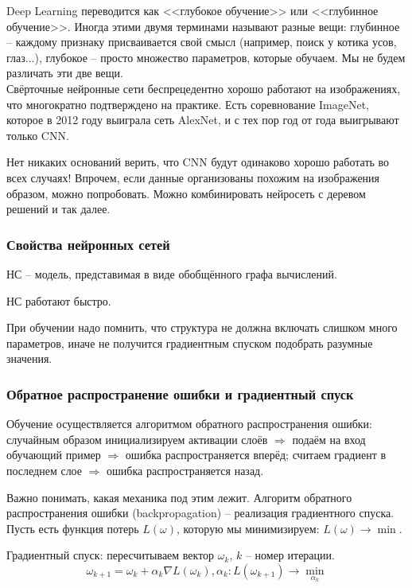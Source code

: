 \documentclass[main.tex]{subfiles}
\begin{document}
Deep Learning переводится как <<глубокое обучение>> или <<глубинное обучение>>.
Иногда этими двумя терминами называют разные вещи: глубинное -- каждому признаку присваивается свой смысл (например, поиск у котика усов, глаз...), глубокое -- просто множество параметров, которые обучаем.
Мы не будем различать эти две вещи. \\

Свёрточные нейронные сети беспрецедентно хорошо работают на изображениях, что многократно подтверждено на практике.
Есть соревнование ImageNet, которое в 2012 году выиграла сеть AlexNet, и с тех пор год от года выигрывают только CNN.

Нет никаких оснований верить, что CNN будут одинаково хорошо работать во всех случаях!
Впрочем, если данные организованы похожим на изображения образом, можно попробовать.
Можно комбинировать нейросеть с деревом решений и так далее.

\subsubsection{Свойства нейронных сетей}

НС -- модель, представимая в виде обобщённого графа вычислений.

НС работают быстро.

При обучении надо помнить, что структура не должна включать слишком много параметров, иначе не получится градиентным спуском подобрать разумные значения.

\subsubsection{Обратное распространение ошибки и градиентный спуск}

Обучение осуществляется алгоритмом обратного распространения ошибки:
случайным образом инициализируем активации слоёв $ \Rightarrow $ подаём на вход обучающий пример $ \Rightarrow $ ошибка распространяется вперёд; считаем градиент в последнем слое $ \Rightarrow $ ошибка распространяется назад.

Важно понимать, какая механика под этим лежит.
Алгоритм обратного распространения ошибки (backpropagation) -- реализация градиентного спуска. \\

Пусть есть функция потерь $ L(\omega) $, которую мы минимизируем: $ L(\omega) \to \min $.

Градиентный спуск: пересчитываем вектор $\omega_k$, $k$ -- номер итерации.  
$$ \omega_{k+1} = \omega_k + \alpha_k \nabla L(\omega_k), \alpha_k : L(\omega_{k+1}) \to \min_{\alpha_k} $$
\end{document}

